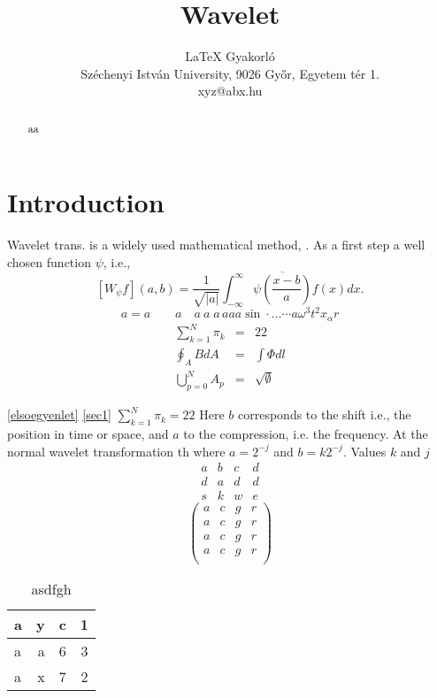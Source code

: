 \documentclass[a4paper, twocolumn]{article}
\begin{document}




\title{Wavelet}
\author{LaTeX Gyakorl\'o\\
Sz\'echenyi Istv\'an University, 9026 Gy\H{o}r, Egyetem t\'er 1.\\
xyz@abx.hu}
\maketitle


\begin{abstract}
aa
\end{abstract}



\section{Introduction\label{sec1}}
Wavelet trans. is a widely used mathematical method,  \cite{daub92}. As a first step a well chosen function $\psi$, i.e., 
\begin{equation}\label{elsoegyenlet}
[W_\psi f](a,b)=\frac{1}{\sqrt{|a|}} \int_{-\infty}^\infty \overline{\psi \left( \frac{x-b}{a} \right)}f(x)dx.
\end{equation}
\[
a=a\qquad a\quad a\ a\;a\,aa\!a\sin \cdot \ldots \cdots a\omega^3 t^2x_\alpha r
\]
\begin{eqnarray}
  \sum_{k=1}^N \pi_k&=& 22 \label{eq1}\\
  \oint_A B dA &=& \int \Phi dl \nonumber\\
  \bigcup_{p=0}^N A_p&=& \sqrt{\emptyset} \label{eeeee}
\end{eqnarray}

\noindent \ref{elsoegyenlet} \ref{sec1} $\sum_{k=1}^N \pi_k= 22$ Here $b$ corresponds to the shift i.e., the position in time or space, and $a$ to the compression, i.e. the frequency. At the normal wavelet transformation th where $a = 2^{-j}$ and $b = k2^{-j}$. Values $k$ and $j$ 
\[
\begin{array}{lccc}
  a & b & c & d \\
  d & a & d & d \\
  s & k & w & e
\end{array}
\]
\[
\left(
  \begin{array}{cccc}
    a & c & g & r \\
    a & c & g & r \\
    a & c & g & r \\
    a & c & g & r \\
  \end{array}
\right)
\]
\begin{table}
\caption{asdfgh}
\label{asasas}
\begin{tabular}{|l|r|c|c|}
  \hline
  a & y & c & 1 \\
  \hline
  a & a & 6 & 3 \\
  \cline{2-3}
  a & x & 7 & 2 \\
  \hline
\end{tabular}
\end{table}
\end{document}
